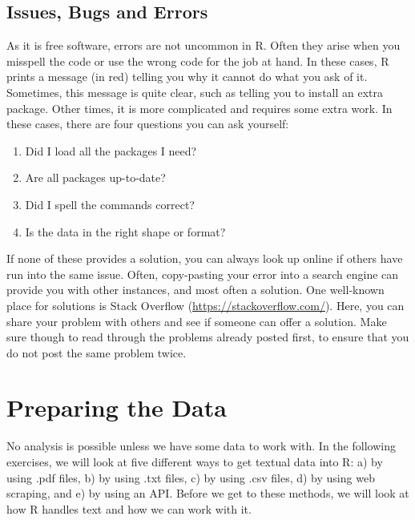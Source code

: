 \documentclass[
]{book}
\providecommand{\tightlist}{%
  \setlength{\itemsep}{0pt}\setlength{\parskip}{0pt}}
\begin{document}
\hypertarget{issues-bugs-and-errors}{%
\section{Issues, Bugs and Errors}\label{issues-bugs-and-errors}}

As it is free software, errors are not uncommon in R. Often they arise when you misspell the code or use the wrong code for the job at hand. In these cases, R prints a message (in red) telling you why it cannot do what you ask of it. Sometimes, this message is quite clear, such as telling you to install an extra package. Other times, it is more complicated and requires some extra work. In these cases, there are four questions you can ask yourself:

\begin{enumerate}
\def\labelenumi{\arabic{enumi}.}
\tightlist
\item
  Did I load all the packages I need?
\item
  Are all packages up-to-date?
\item
  Did I spell the commands correct?
\item
  Is the data in the right shape or format?
\end{enumerate}

If none of these provides a solution, you can always look up online if others have run into the same issue. Often, copy-pasting your error into a search engine can provide you with other instances, and most often a solution. One well-known place for solutions is Stack Overflow (\url{https://stackoverflow.com/}). Here, you can share your problem with others and see if someone can offer a solution. Make sure though to read through the problems already posted first, to ensure that you do not post the same problem twice.

\hypertarget{preparing-the-data}{%
\chapter{Preparing the Data}\label{preparing-the-data}}

No analysis is possible unless we have some data to work with. In the following exercises, we will look at five different ways to get textual data into R: a) by using .pdf files, b) by using .txt files, c) by using .csv files, d) by using web scraping, and e) by using an API. Before we get to these methods, we will look at how R handles text and how we can work with it.
\end{document}
